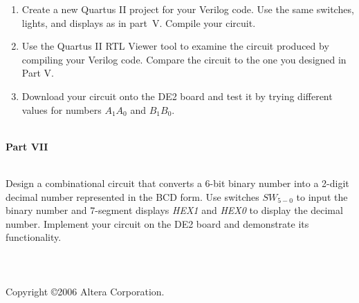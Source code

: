 \documentclass[psfig,10pt,fullpage]{article}
\begin{document}
\begin{enumerate}
\item Create a new Quartus II project for your Verilog code. Use the same switches, lights, and
displays as in part~V. Compile your circuit.
\item Use the Quartus II RTL Viewer tool to examine the circuit produced by compiling your
Verilog code. Compare the circuit to the one you designed in Part V.
\item Download your circuit onto the DE2 board and test it by trying different values for 
numbers $A_1 A_0$ and $B_1 B_0$.
\end{enumerate}

~\\
\noindent
{\bf Part VII}

~\\
\noindent
Design a combinational circuit that converts a 6-bit binary number into 
a 2-digit decimal number represented in the BCD form. 
Use switches $SW_{5-0}$ to input the binary number and 7-segment displays 
{\it HEX1} and {\it HEX0} to display the decimal number.
Implement your circuit on the DE2 board and demonstrate its functionality.
~\\
~\\
~\\
~\\
Copyright \copyright 2006 Altera Corporation. 
\end{document}
